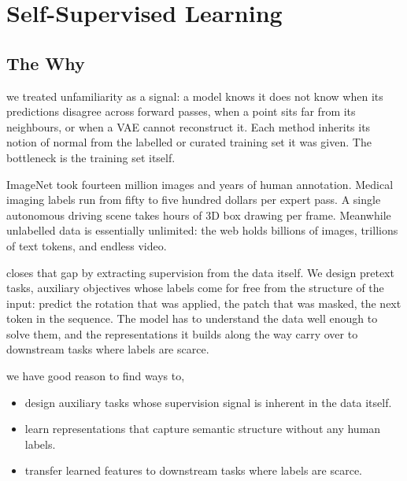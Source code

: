 
\chapter{Self-Supervised Learning}


\section{The Why}


 we treated unfamiliarity as a signal: a model knows it does not know when its predictions disagree across forward passes, when a point sits far from its neighbours, or when a VAE cannot reconstruct it. Each method inherits its notion of normal from the labelled or curated training set it was given. The bottleneck is the training set itself.

 ImageNet took fourteen million images and years of human annotation. Medical imaging labels run from fifty to five hundred dollars per expert pass. A single autonomous driving scene takes hours of 3D box drawing per frame. Meanwhile unlabelled data is essentially unlimited: the web holds billions of images, trillions of text tokens, and endless video.

 closes that gap by extracting supervision from the data itself. We design pretext tasks, auxiliary objectives whose labels come for free from the structure of the input: predict the rotation that was applied, the patch that was masked, the next token in the sequence. The model has to understand the data well enough to solve them, and the representations it builds along the way carry over to downstream tasks where labels are scarce.

 we have good reason to find ways to,
\begin{itemize}
    \item design auxiliary tasks whose supervision signal is inherent in the data itself.
    \item learn representations that capture semantic structure without any human labels.
    \item transfer learned features to downstream tasks where labels are scarce.
\end{itemize}

